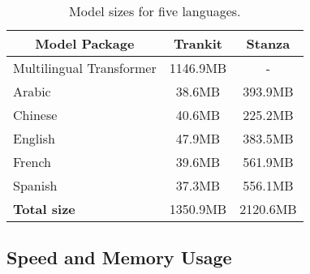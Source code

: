 \documentclass[11pt,a4paper]{article}
\begin{document}
\begin{table}[ht]
\small 
\centering
{}
\caption{Run time on processing the English EWT treebank and the English Ontonotes NER dataset. Measurements are done on an NVIDIA Titan RTX card.}
\label{tab:speed}
\end{table}

\begin{table}[ht]
\centering
\small 
\begin{tabular}{l|c|c}
\multicolumn{1}{c|}{Model Package} & Trankit  & Stanza   \\ \hline
Multilingual Transformer                & 1146.9MB & -        \\ \hline
Arabic                              & 38.6MB   & 393.9MB  \\ \hline
Chinese                             & 40.6MB   & 225.2MB  \\ \hline
English                             & 47.9MB   & 383.5MB  \\ \hline
French                              & 39.6MB   & 561.9MB  \\ \hline
Spanish                             & 37.3MB   & 556.1MB  \\ \hline \hline
{\bf Total size}                          & 1350.9MB & 2120.6MB \\ \end{tabular}
\caption{Model sizes for five languages.}
\label{tab:model-size}
\end{table}



\subsection{Speed and Memory Usage}
\end{document}
